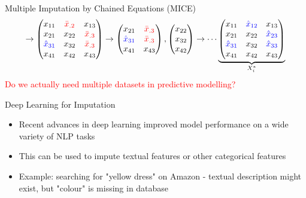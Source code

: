 \documentclass[aspectratio=43]{beamer}
\begin{document}
\begin{frame}{Multiple Imputation by Chained Equations (MICE)}
$$
\rightarrow
\begin{pmatrix}
x_{11} 		& \textcolor{red}{\bar{x}_{.2}} 	& x_{13} \\
x_{21} 		& x_{22} 		& \textcolor{red}{\bar{x}_{.3}} \\
\textcolor{blue}{\hat{x}_{31}} & x_{32} 	& \textcolor{red}{\bar{x}_{.3}} \\
x_{41} 		& x_{42} 	& x_{43} \\
\end{pmatrix}
\rightarrow
\begin{pmatrix}
x_{21} 		& \textcolor{red}{\bar{x}_{.3}} \\
\textcolor{blue}{\hat{x}_{31}} & \textcolor{red}{\bar{x}_{.3}} \\
x_{41} 		& x_{43} \\
\end{pmatrix},
\begin{pmatrix}
x_{22} \\
x_{32} \\
x_{42} \\
\end{pmatrix}
\rightarrow
\cdots
\underbrace{\begin{pmatrix}
x_{11} 		& \textcolor{blue}{\hat{x}_{12}} 	& x_{13} \\
x_{21} 		& x_{22} 		& \textcolor{blue}{\hat{x}_{23}} \\
\textcolor{blue}{\hat{x}_{31}} & x_{32} 	& \textcolor{blue}{\hat{x}_{33}} \\
x_{41} 		& x_{42} 	& x_{43} \\
\end{pmatrix}}_{X_i^{*}}
$$
\textcolor{red}{Do we actually need multiple datasets in predictive modelling?}
\end{frame}

\begin{frame}{Deep Learning for Imputation}
\begin{itemize}
	\item Recent advances in deep learning improved model performance on a wide variety of NLP tasks
	\item This can be used to impute textual features or other categorical features
	\item Example: searching for "yellow dress" on Amazon - textual description might exist, but "colour" is missing in database
\end{itemize}
\end{frame}
\end{document}
